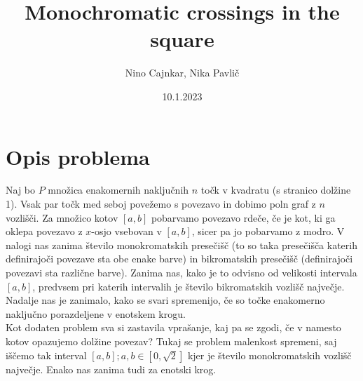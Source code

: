 \documentclass[12pt, a4paper]{article}
\title{Monochromatic crossings in the square}
\date{10.1.2023}
\author{Nino Cajnkar, Nika Pavlič}
\begin{document}
	\maketitle
	\section{Opis problema}
	Naj bo $P$ množica enakomernih naključnih $n$ točk v kvadratu (s stranico dolžine 1). Vsak par točk med seboj povežemo s povezavo in dobimo poln graf z $n$ vozlišči. Za množico kotov $\left[{a,b}\right]$ pobarvamo povezavo rdeče, če je kot, ki ga oklepa povezavo z $x$-osjo vsebovan v $\left[{a,b}\right]$, sicer pa jo pobarvamo z modro. V nalogi nas zanima število monokromatskih presečišč (to so taka presečišča katerih definirajoči povezave sta obe enake barve) in bikromatskih presečišč (definirajoči povezavi sta različne barve). Zanima nas, kako je to odvisno od velikosti intervala $\left[{a,b}\right]$, predvsem pri katerih intervalih je število bikromatskih vozlišč največje. \\
	Nadalje nas je zanimalo, kako se svari spremenijo, če so točke enakomerno naključno porazdeljene v enotskem krogu. \\
	Kot dodaten problem sva si zastavila vprašanje, kaj pa se zgodi, če v namesto kotov opazujemo dolžine povezav? Tukaj se problem malenkost spremeni, saj iščemo tak interval $\left[{a,b}\right]; a,b \in \left[0,\sqrt{2}\right]$ kjer je število monokromatskih vozlišč največje. Enako nas zanima tudi za enotski krog.
\end{document}
